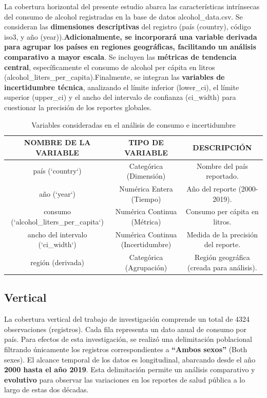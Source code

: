 \documentclass[oneside,11pt]{Latex/Classes/PhDthesisPSnPDF}
\begin{document}
La cobertura horizontal del presente estudio abarca las características
intrínsecas del consumo de alcohol registradas en la base de datos
alcohol\_data.csv. Se consideran las \textbf{dimensiones descriptivas}
del registro (país (country), código iso3, y año
(year)).\textbf{Adicionalmente, se incorporará una variable derivada
para agrupar los países en regiones geográficas, facilitando un análisis
comparativo a mayor escala}. Se incluyen las \textbf{métricas de
tendencia central}, específicamente el consumo de alcohol per cápita en
litros (alcohol\_liters\_per\_capita).Finalmente, se integran las
\textbf{variables de incertidumbre técnica}, analizando el límite
inferior (lower\_ci), el límite superior (upper\_ci) y el ancho del
intervalo de confianza (ci\_width) para cuestionar la precisión de los
reportes globales.\\

\begin{table}[ht]
\centering
\caption{Variables consideradas en el análisis de consumo e incertidumbre}
\label{tab:variables}
\resizebox{15cm}{!} {
\begin{tabular}{ccc}
  \hline
  \textbf{NOMBRE DE LA VARIABLE} & \textbf{TIPO DE VARIABLE} & \textbf{DESCRIPCIÓN} \\
  \hline
  país (`country`) & Categórica (Dimensión) & Nombre del país reportado. \\
  año (`year`) & Numérica Entera (Tiempo) & Año del reporte (2000-2019). \\
  consumo (`alcohol\_liters\_per\_capita`) & Numérica Continua (Métrica) & Consumo per cápita en litros. \\
  ancho del intervalo (`ci\_width`) & Numérica Continua (Incertidumbre) & Medida de la precisión del reporte. \\
  región (derivada) & Categórica (Agrupación) & Región geográfica (creada para análisis). \\
  \hline
\end{tabular}
}
\end{table}

\subsection{Vertical}

La cobertura vertical del trabajo de investigación comprende un total de
4324 observaciones (registros). Cada fila representa un dato anual de
consumo por país. Para efectos de esta investigación, se realizó una
delimitación poblacional filtrando únicamente los registros
correspondientes a \textbf{``Ambos sexos''} (Both sexes). El alcance
temporal de los datos es longitudinal, abarcando desde el año
\textbf{2000 hasta el año 2019}. Esta delimitación permite un análisis
comparativo y \textbf{evolutivo} para observar las variaciones en los
reportes de salud pública a lo largo de estas dos décadas.\\
\end{document}
